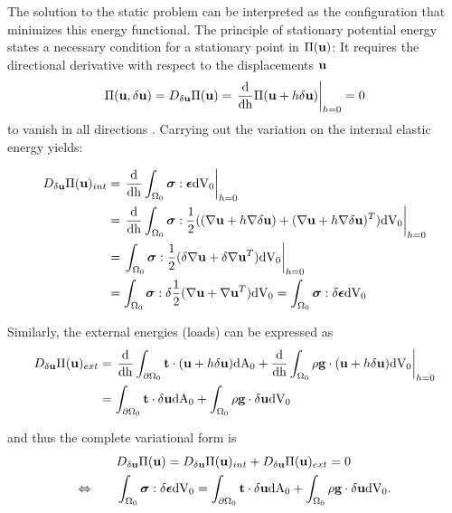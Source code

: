 The solution to the static problem can be interpreted as the configuration that minimizes this energy functional.  The principle of stationary potential energy states a necessary condition for a stationary point in $\Pi(\mathbf {u} )$: It requires the directional derivative with respect to the displacements $\mathbf {u} $ 
 \begin{equation}
 \Pi(\mathbf {u} , \delta \mathbf {u} ) = D_{\delta \mathbf {u} } \Pi (\mathbf {u} ) = \left. \frac{\textnormal{d}}{\textnormal{dh}} \Pi (\mathbf {u}  + h \delta \mathbf {u} ) \right| _{h=0} = 0
\end{equation}
to vanish in all directions \cite{Holzapfel2000}. Carrying out the variation on the internal elastic energy yields:

 \begin{alignat}{1}
D_{\delta \mathbf {u} } \Pi (\mathbf {u} ) _{int} &= \left. \frac{\textnormal{d}}{\textnormal{dh}} \int _{\Omega _0}  \boldsymbol{\sigma} : \boldsymbol{\epsilon}   \textnormal{dV}_0 \right| _{h=0}   \\
&= \left. \frac{\textnormal{d}}{\textnormal{dh}} \int _{\Omega _0}  \boldsymbol{\sigma} : \frac{1}{2}((\nabla \mathbf {u}  + h \nabla \delta \mathbf {u} ) +(\nabla \mathbf {u}  + h \nabla \delta \mathbf {u} )^T)  \textnormal{dV}_0 \right| _{h=0} \\
&= \left. \int _{\Omega _0}  \boldsymbol{\sigma} : \frac{1}{2}( \delta \nabla \mathbf {u}  + \delta \nabla \mathbf {u} ^T)  \textnormal{dV}_0 \right| _{h=0}  \\
&=  \int _{\Omega _0}  \boldsymbol{\sigma} : \delta \frac{1}{2} ( \nabla \mathbf {u}  + \nabla \mathbf {u} ^T)  \textnormal{dV}_0  =   \int _{\Omega _0}  \boldsymbol{\sigma} : \delta \boldsymbol{\epsilon}   \textnormal{dV}_0 
\label{InternalVariations}
\end{alignat}

Similarly, the external energies (loads) can be expressed as
 \begin{alignat}{1}
D_{\delta \mathbf {u} } \Pi (\mathbf {u} ) _{ext} &= \left. \frac{\textnormal{d}}{\textnormal{dh}} \int _{\partial \Omega _0}  \mathbf {t}  \cdot (\mathbf {u}  + h \delta \mathbf {u} )    \textnormal{dA}_0 +  \frac{\textnormal{d}}{\textnormal{dh}} \int _{\Omega _0}  \rho \mathbf {g}  \cdot (\mathbf {u}  + h \delta \mathbf {u} )  \textnormal{dV}_0 \right| _{h=0}   \\
&= \int _{\partial \Omega _0}  \mathbf {t}  \cdot \delta \mathbf {u}     \textnormal{dA}_0  +  \int _{\Omega _0}  \rho \mathbf {g}  \cdot \delta \mathbf {u}   \textnormal{dV}_0
\label{ExternalVariations}
\end{alignat}

and thus the complete variational form is
 \begin{alignat}{1}
& D_{\delta \mathbf {u} } \Pi (\mathbf {u} ) = D_{\delta \mathbf {u} } \Pi (\mathbf {u} )_{int} + D_{\delta \mathbf {u} } \Pi (\mathbf {u} )_{ext}  = 0 \\
\Leftrightarrow \qquad & \int _{\Omega _0}  \boldsymbol{\sigma} : \delta \boldsymbol{\epsilon}   \textnormal{dV}_0 = \int _{\partial \Omega _0}  \mathbf {t}  \cdot \delta \mathbf {u}     \textnormal{dA}_0  +  \int _{\Omega _0}  \rho \mathbf {g}  \cdot \delta \mathbf {u}   \textnormal{dV}_0.
\label{VariationalFormStatic}
\end{alignat}

